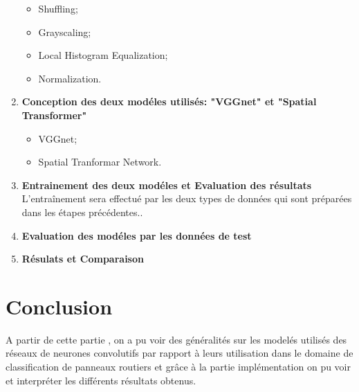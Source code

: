 \begin{enumerate}
   \begin{itemize}
        \item Shuffling;
        \item Grayscaling;
        \item Local Histogram Equalization;
        \item Normalization.
    \end{itemize}
    \item {\textbf{Conception des deux modéles utilisés: "VGGnet" et "Spatial Transformer"}}\\
     \begin{itemize}
        \item VGGnet;
        \item Spatial Tranformar Network.
        
    \end{itemize}
    \item {\textbf{Entrainement des deux modéles et Evaluation des résultats}}\\
    L'entraînement sera effectué par les deux types de données qui sont préparées dans les étapes précédentes..
     \item {\textbf{Evaluation  des modéles par les données de test}}\\
     
    \item {\textbf{Résulats et Comparaison}}\\




\end{enumerate}

\section{Conclusion}
A partir de cette partie , on a pu voir des généralités sur les modelés utilisés des réseaux de neurones convolutifs par rapport à leurs utilisation dans le domaine de classification de panneaux routiers et grâce à la partie implémentation on pu voir et interpréter les différents résultats obtenus.








